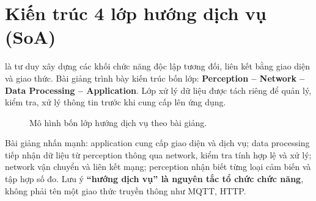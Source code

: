 \section{Kiến trúc 4 lớp hướng dịch vụ (SoA)}
 là tư duy xây dựng các khối chức năng độc lập tương đối, liên kết bằng giao diện và giao thức. Bài giảng trình bày kiến trúc bốn lớp: \textbf{Perception -- Network -- Data Processing -- Application}. Lớp xử lý dữ liệu được tách riêng để quản lý, kiểm tra, xử lý thông tin trước khi cung cấp lên ứng dụng.
\begin{figure}[H]\centering
{}\caption{Mô hình bốn lớp hướng dịch vụ theo bài giảng.}
\end{figure}
Bài giảng nhấn mạnh: application cung cấp giao diện và dịch vụ; data processing tiếp nhận dữ liệu từ perception thông qua network, kiểm tra tính hợp lệ và xử lý; network vận chuyển và liên kết mạng; perception nhận biết từng loại cảm biến và tập hợp số đo. Lưu ý \textbf{``hướng dịch vụ'' là nguyên tắc tổ chức chức năng}, không phải tên một giao thức truyền thông như MQTT, HTTP.

